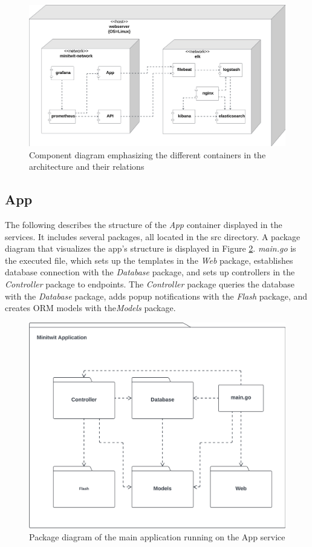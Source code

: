 \documentclass[12pt, a4paper, oneside]{book}
\begin{document}
\begin{figure}[H]
    \centering
    \includegraphics[width=0.8\linewidth]{images/uml-component-containers.png}
    \caption{Component diagram emphasizing the different containers in the architecture and their relations}
    \label{fig:uml-containers}
\end{figure}

\subsection{App}
The following describes the structure of the \textit{App} container displayed in the services.
It includes several packages, all located in the src directory.
A package diagram that visualizes the app's structure is displayed in Figure \ref{fig:package-diagram-app}.
\textit{main.go} is the executed file, which sets up the templates in the \textit{Web} package, establishes database connection with the \textit{Database} package, and sets up controllers in the \textit{Controller} package to endpoints.
The \textit{Controller} package queries the database with the \textit{Database} package, adds popup notifications with the \textit{Flash} package, and creates ORM models with the\textit{Models} package.

\begin{figure}[H]
    \centering
    \includegraphics[width=0.6\linewidth]{images/uml-package-app.png}
    \caption{Package diagram of the main application running on the App service}
    \label{fig:package-diagram-app}
\end{figure}
\end{document}
